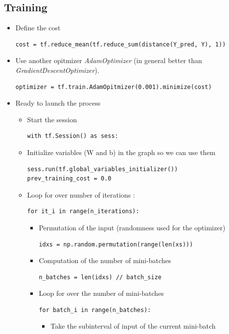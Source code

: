 \documentclass[12pt,a4paper]{article}
\begin{document}
\subsection{Training}
\begin{itemize}
\item Define the cost
\begin{lstlisting}
cost = tf.reduce_mean(tf.reduce_sum(distance(Y_pred, Y), 1))
\end{lstlisting}
\item Use another opitmizer \textit{AdamOptimizer} (in general better than \textit{GradientDescentOptimizer}). 
\begin{lstlisting}
optimizer = tf.train.AdamOpitmizer(0.001).minimize(cost)
\end{lstlisting}
\item Ready to launch the process
\begin{itemize}
\item Start the session
\begin{lstlisting}
with tf.Session() as sess:
\end{lstlisting}
\item Initialize variables (W and  b) in the graph so we can use them
\begin{lstlisting}
sess.run(tf.global_variables_initializer())
prev_training_cost = 0.0
\end{lstlisting}
\item Loop for over number of iterations :
\begin{lstlisting}
for it_i in range(n_iterations):
\end{lstlisting}
\begin{itemize}
\item Permutation of the input (randomness used for the optimizer)
\begin{lstlisting}
idxs = np.random.permutation(range(len(xs)))
\end{lstlisting}
\item Computation of the number of mini-batches
\begin{lstlisting}
n_batches = len(idxs) // batch_size
\end{lstlisting}
\item Loop for over the number of mini-batches
\begin{lstlisting}
for batch_i in range(n_batches):
\end{lstlisting}
\begin{itemize}
\item Take the subinterval of input of the current mini-batch

\end{itemize}
\end{itemize}
\end{itemize}
\end{itemize}
\end{document}

